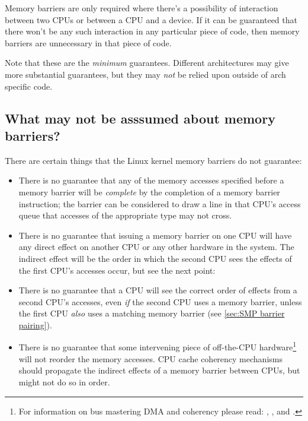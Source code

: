 Memory barriers are only required where there's a possibility of interaction
between two CPUs or between a CPU and a device.
If it can be guaranteed that there won't be any such interaction in any
particular piece of code, then memory barriers are unnecessary in that
piece of code.


Note that these are the \emph{minimum} guarantees.
Different architectures may give more substantial guarantees, but they
may \emph{not} be relied upon outside of arch specific code.


\subsection{What may not be asssumed about memory barriers?}

There are certain things that the Linux kernel memory barriers do not guarantee:

\begin{itemize}
 \item
     There is no guarantee that any of the memory accesses specified before a
     memory barrier will be \emph{complete} by the completion of a memory
     barrier instruction; the barrier can be considered to draw a line in
     that CPU's access queue that accesses of the appropriate type may not
     cross.

 \item
     There is no guarantee that issuing a memory barrier on one CPU will have
     any direct effect on another CPU or any other hardware in the system.
     The indirect effect will be the order in which the second CPU sees the
     effects of the first CPU's accesses occur, but see the next point:

 \item
     There is no guarantee that a CPU will see the correct order of effects
     from a second CPU's accesses, even \emph{if} the second CPU uses a memory
     barrier, unless the first CPU \emph{also} uses a matching memory barrier
     (see \cref{sec:SMP barrier pairing}).

 \item
     There is no guarantee that some intervening piece of off-the-CPU
     hardware\footnote{
	For information on bus mastering DMA and coherency please read:
	,
	, and
	.}
     will not reorder the memory accesses.
     CPU cache coherency mechanisms should propagate the indirect effects
     of a memory barrier between CPUs, but might not do so in order.
\end{itemize}

